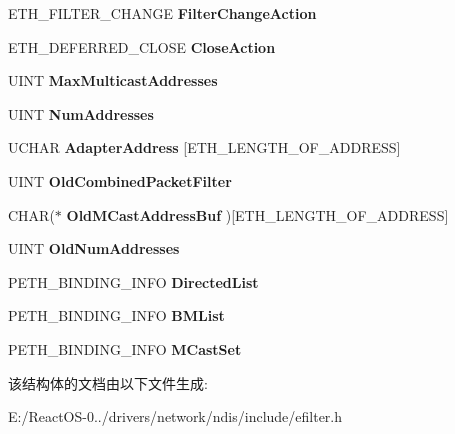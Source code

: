 \begin{DoxyCompactItemize}
E\+T\+H\+\_\+\+F\+I\+L\+T\+E\+R\+\_\+\+C\+H\+A\+N\+GE {\bfseries Filter\+Change\+Action}
\item 
\mbox{\label{struct_e_t_h_i___f_i_l_t_e_r_acef29439fb366b6b3cb08c29e5c954a2}} 
E\+T\+H\+\_\+\+D\+E\+F\+E\+R\+R\+E\+D\+\_\+\+C\+L\+O\+SE {\bfseries Close\+Action}
\item 
\mbox{\label{struct_e_t_h_i___f_i_l_t_e_r_a63a11fbf200ae7f5a17db0716387deef}} 
U\+I\+NT {\bfseries Max\+Multicast\+Addresses}
\item 
\mbox{\label{struct_e_t_h_i___f_i_l_t_e_r_a8c2880a8cdb8991fb0bd99ad770d23e9}} 
U\+I\+NT {\bfseries Num\+Addresses}
\item 
\mbox{\label{struct_e_t_h_i___f_i_l_t_e_r_ad9bf619109cb7d2991f35108165f7431}} 
U\+C\+H\+AR {\bfseries Adapter\+Address} \mbox{[}E\+T\+H\+\_\+\+L\+E\+N\+G\+T\+H\+\_\+\+O\+F\+\_\+\+A\+D\+D\+R\+E\+SS\mbox{]}
\item 
\mbox{\label{struct_e_t_h_i___f_i_l_t_e_r_a7e54d8975af35c87a582eae55993b798}} 
U\+I\+NT {\bfseries Old\+Combined\+Packet\+Filter}
\item 
\mbox{\label{struct_e_t_h_i___f_i_l_t_e_r_a53d91458ffaa9ffb87f9394ee5637cb6}} 
C\+H\+AR($\ast$ {\bfseries Old\+M\+Cast\+Address\+Buf} )\mbox{[}E\+T\+H\+\_\+\+L\+E\+N\+G\+T\+H\+\_\+\+O\+F\+\_\+\+A\+D\+D\+R\+E\+SS\mbox{]}
\item 
\mbox{\label{struct_e_t_h_i___f_i_l_t_e_r_a9bc5db59212b302788000d7d529597bb}} 
U\+I\+NT {\bfseries Old\+Num\+Addresses}
\item 
\mbox{\label{struct_e_t_h_i___f_i_l_t_e_r_a911a10dadb9d7813170542b9e79fc1cb}} 
P\+E\+T\+H\+\_\+\+B\+I\+N\+D\+I\+N\+G\+\_\+\+I\+N\+FO {\bfseries Directed\+List}
\item 
\mbox{\label{struct_e_t_h_i___f_i_l_t_e_r_abf1a755135d76e9fed67be3a28ecd287}} 
P\+E\+T\+H\+\_\+\+B\+I\+N\+D\+I\+N\+G\+\_\+\+I\+N\+FO {\bfseries B\+M\+List}
\item 
\mbox{\label{struct_e_t_h_i___f_i_l_t_e_r_a19b0704f734facc1cab0f7ac432c34d9}} 
P\+E\+T\+H\+\_\+\+B\+I\+N\+D\+I\+N\+G\+\_\+\+I\+N\+FO {\bfseries M\+Cast\+Set}
\end{DoxyCompactItemize}


该结构体的文档由以下文件生成\+:\begin{DoxyCompactItemize}
\item 
E\+:/\+React\+O\+S-\/0../drivers/network/ndis/include/efilter.\+h\end{DoxyCompactItemize}
